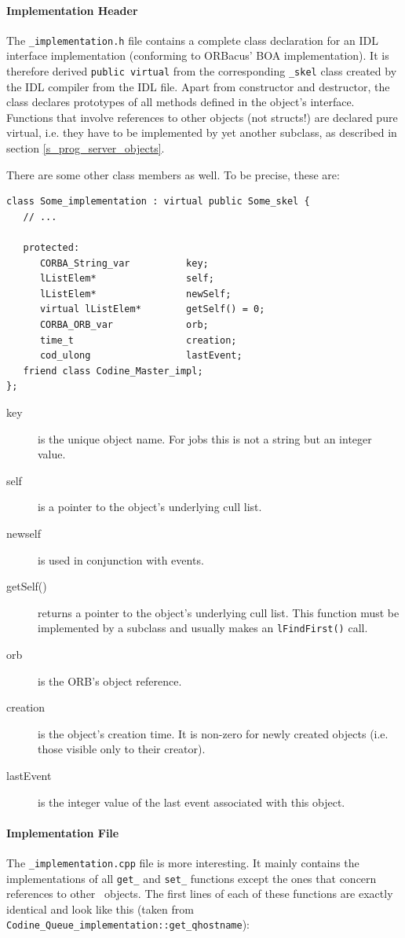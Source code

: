 \paragraph{Implementation Header}
The \texttt{\_implementation.h} file contains a complete class declaration
for an IDL interface implementation (conforming to ORBacus' BOA
implementation). It is therefore derived \texttt{public virtual} from the
corresponding \texttt{\_skel} class created by the IDL compiler from the IDL
file. Apart from constructor and destructor, the class declares prototypes of
all methods defined in the object's interface. Functions that involve
references to other objects (not structs!) are declared pure virtual, i.e.
they have to be implemented by yet another subclass, as described in section
\ref{s_prog_server_objects}.

There are some other class members as well. To be precise, these are:
\begin{Verbatim}[fontsize=\small, frame=single]
class Some_implementation : virtual public Some_skel {
   // ...

   protected:
      CORBA_String_var          key;
      lListElem*                self;
      lListElem*                newSelf;
      virtual lListElem*        getSelf() = 0;
      CORBA_ORB_var             orb;
      time_t                    creation;
      cod_ulong                 lastEvent;
   friend class Codine_Master_impl;
};
\end{Verbatim}
\begin{description}
\item[key] is the unique object name. For jobs this is not a string but an
integer value.
\item[self] is a pointer to the object's underlying cull list.
\item[newself] is used in conjunction with events.
\item[getSelf()] returns a pointer to the object's underlying cull list. This
function must be implemented by a subclass and usually makes an 
\texttt{lFindFirst()} call.
\item[orb] is the ORB's object reference.
\item[creation] is the object's creation time. It is non-zero for newly
created objects (i.e. those visible only to their creator).
\item[lastEvent] is the integer value of the last event associated with this
object.
\end{description}

\paragraph{Implementation File}
The \texttt{\_implementation.cpp} file is more interesting. It mainly
contains the implementations of all \texttt{get\_} and \texttt{set\_}
functions except the ones that concern references to other \codine\ objects.
The first lines of each of these functions are exactly identical and look
like this (taken from \texttt{Codine\_Queue\_implementation::\-get\_qhostname}):

